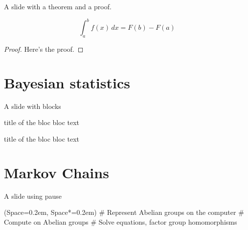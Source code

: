 \documentclass[12pt, aspectratio=149]{beamer}
\newcommand{\listSpace}{0.2em}
\theoremstyle{plain}
\begin{document}
\begin{frame}[fragile]{A slide with a theorem and a proof.}
\begin{theorem}[Integral]
	\begin{equation*}
		\int_{a}^{b} f(x) \, dx = F(b) - F(a)
	\end{equation*}
\end{theorem}
\begin{proof}
Here's the proof.
\end{proof}
\end{frame}

\section{Bayesian statistics}
\begin{frame}[fragile]{A slide with blocks}
	\begin{block}{title of the bloc}
	bloc text
	\end{block}
	
	\begin{exampleblock}{title of the bloc}
	bloc text
	\end{exampleblock}
\end{frame}

\section{Markov Chains}
\begin{frame}[fragile]{A slide using pause}
	\begin{easylist}[itemize]
		\ListProperties(Space=\listSpace, Space*=\listSpace)
		# Represent Abelian groups on the computer \pause
		# Compute on Abelian groups \pause
		# Solve equations, factor group homomorphisms
	\end{easylist}
\end{frame}
\end{document}
